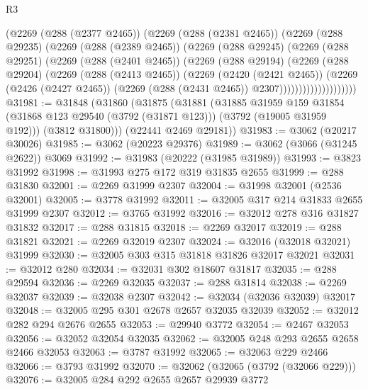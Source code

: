 \begin{lexlean}{R3}
\begin{coremodule}
                  (@2269
                    (@288 (@2377 @2465))
                    (@2269
                      (@288 (@2381 @2465))
                      (@2269
                        (@288 @29235)
                        (@2269
                          (@288 (@2389 @2465))
                          (@2269
                            (@288 @29245)
                            (@2269
                              (@288 @29251)
                              (@2269
                                (@288 (@2401 @2465))
                                (@2269
                                  (@288 @29194)
                                  (@2269
                                    (@288 @29204)
                                    (@2269
                                      (@288 (@2413 @2465))
                                      (@2269
                                        (@2420 (@2421 @2465))
                                        (@2269
                                          (@2426 (@2427 @2465))
                                          (@2269 (@288 (@2431 @2465)) @2307))))))))))))))))))))
@31981 := @31848
    (@31860
      (@31875
        (@31881
          (@31885
            @31959
            @159
            @31854
            (@31868 @123 @29540 (@3792 (@31871 @123)))
            (@3792 (@19005 @31959 @192)))
          (@3812 @31800)))
      (@22441 @2469 @29181))
@31983 := @3062 (@20217 @30026)
@31985 := @3062 (@20223 @29376)
@31989 := @3062 (@3066 (@31245 @2622)) @3069
@31992 := @31983 (@20222 (@31985 @31989))
@31993 := @3823 @31992
@31998 := @31993 @275 @172 @319 @31835 @2655
@31999 := @288 @31830
@32001 := @2269 @31999 @2307
@32004 := @31998 @32001 (@2536 @32001)
@32005 := @3778 @31992
@32011 := @32005 @317 @214 @31833 @2655 @31999 @2307
@32012 := @3765 @31992
@32016 := @32012 @278 @316 @31827 @31832
@32017 := @288 @31815
@32018 := @2269 @32017
@32019 := @288 @31821
@32021 := @2269 @32019 @2307
@32024 := @32016 (@32018 @32021) @31999
@32030 := @32005 @303 @315 @31818 @31826 @32017 @32021
@32031 := @32012 @280
@32034 := @32031 @302 @18607 @31817
@32035 := @288 @29594
@32036 := @2269 @32035
@32037 := @288 @31814
@32038 := @2269 @32037
@32039 := @32038 @2307
@32042 := @32034 (@32036 @32039) @32017
@32048 := @32005 @295 @301 @2678 @2657 @32035 @32039
@32052 := @32012 @282 @294 @2676 @2655
@32053 := @29940 @3772
@32054 := @2467 @32053
@32056 := @32052 @32054 @32035
@32062 := @32005 @248 @293 @2655 @2658 @2466 @32053
@32063 := @3787 @31992
@32065 := @32063 @229 @2466
@32066 := @3793 @31992
@32070 := @32062 (@32065 (@3792 (@32066 @229)))
@32076 := @32005 @284 @292 @2655 @2657 @29939 @3772

\end{coremodule}
\end{lexlean}
